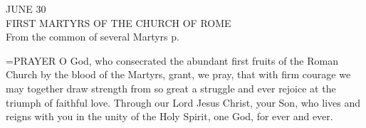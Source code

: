 \begin{center}\normalsize JUNE 30\\
\footnotesize FIRST MARTYRS OF THE CHURCH OF ROME\\
\footnotesize From the common of several Martyrs p.\\
\end{center}

\hangindent=\parindent \small{PRAYER 
O God, who consecrated
the abundant first fruits of the Roman Church
by the blood of the Martyrs,
grant, we pray, that with firm courage
we may together draw strength from so great a struggle
and ever rejoice at the triumph of faithful love.
Through our Lord Jesus Christ, your Son,
who lives and reigns with you in the unity of the Holy Spirit,
one God, for ever and ever.\\}
 
